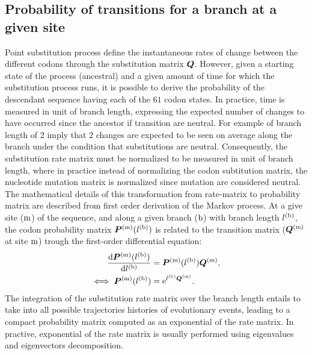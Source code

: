 \subsection{Probability of {transitions} for a branch at a given site}
Point \gls{substitution} process define the instantaneous rates of change between the different \glspl{codon} through the \gls{substitution} matrix $\bm{Q}$.
However, given a starting state of the process (ancestral) and a given amount of time for which the \gls{substitution} process runs, it is possible to derive the probability of the descendant sequence having each of the $61$ \gls{codon} states.
In practice, time is measured in unit of branch length, expressing the expected number of changes to have occurred since the ancestor if {transition} are \gls{neutral}.
For example of branch length of $2$ imply that $2$ changes are expected to be seen on average along the branch under the condition that \glspl{substitution} are \gls{neutral}.
Consequently, the \gls{substitution} rate matrix must be normalized to be measured in unit of branch length, where in practice instead of normalizing the \gls{codon} subtitution matrix, the nucleotide mutation matrix is normalized since mutation are considered \gls{neutral}.
The mathematical details of this transformation from rate-matrix to probability matrix are described from first order derivation of the Markov process.
At a give site ($\text{m}$) of the sequence, and along a given branch ($\text{b}$) with branch length $l^{(\text{b})}$, the \gls{codon} probability matrix $\bm{P}^{(\text{m})}(l^{(\text{b})})$ is related to the {transition} matrix ($\bm{Q}^{(\text{m})}$ at site $\text{m}$) trough the first-order differential equation:
\begin{align}
    \dfrac{\mathrm{d} \bm{P}^{(\text{m})}(l^{(\text{b})})}{\mathrm{d} l^{(\text{b})}}    & = \bm{P}^{(\text{m})}(l^{(\text{b})}) \bm{Q}^{(\text{m})}, \\
    \iff \bm{P}^{(\text{m})}(l^{(\text{b})}) & = \mathrm{e}^{l^{(\text{b})} \bm{Q}^{(\text{m})}}.
\end{align}
The integration of the \gls{substitution} rate matrix over the branch length entails to take into all possible trajectories histories of evolutionary events, leading to a compact probability matrix computed as an exponential of the rate matrix.
In practive, exponential of the rate matrix is usually performed using eigenvalues and eigenvectors decomposition.

